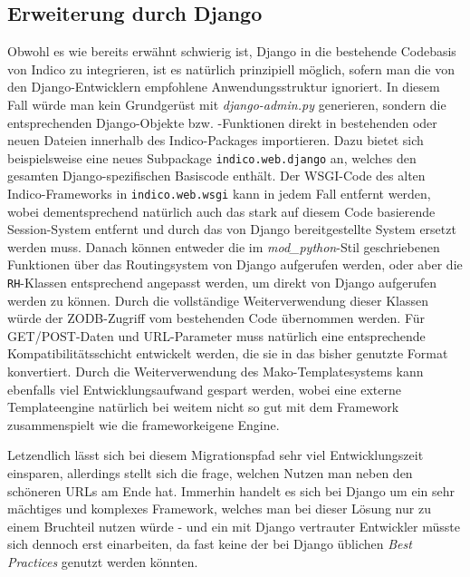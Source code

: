 \subsection{Erweiterung durch Django}
Obwohl es wie bereits erwähnt schwierig ist, Django in die bestehende Codebasis von Indico zu
integrieren, ist es natürlich prinzipiell möglich, sofern man die von den Django-Entwicklern
empfohlene Anwendungsstruktur ignoriert. In diesem Fall würde man kein Grundgerüst mit
\emph{django-admin.py} generieren, sondern die entsprechenden Django-Objekte bzw. -Funktionen direkt
in bestehenden oder neuen Dateien innerhalb des Indico-Packages importieren. Dazu bietet sich
beispielsweise eine neues Subpackage \lstinline{indico.web.django} an, welches den gesamten
Django-spezifischen Basiscode enthält. Der WSGI-Code des alten Indico-Frameworks in
\lstinline{indico.web.wsgi} kann in jedem Fall entfernt werden, wobei dementsprechend natürlich auch
das stark auf diesem Code basierende Session-System entfernt und durch das von Django
bereitgestellte System ersetzt werden muss. Danach können entweder die im \emph{mod\_python}-Stil
geschriebenen Funktionen über das Routingsystem von Django aufgerufen werden, oder aber die
\lstinline{RH}-Klassen entsprechend angepasst werden, um direkt von Django aufgerufen werden zu
können. Durch die vollständige Weiterverwendung dieser Klassen würde der ZODB-Zugriff vom
bestehenden Code übernommen werden. Für GET/POST-Daten und URL-Parameter muss natürlich eine
entsprechende Kompatibilitätsschicht entwickelt werden, die sie in das bisher genutzte Format
konvertiert. Durch die Weiterverwendung des Mako-Templatesystems kann ebenfalls viel
Entwicklungsaufwand gespart werden, wobei eine externe Templateengine natürlich bei weitem nicht so
gut mit dem Framework zusammenspielt wie die frameworkeigene Engine.

Letzendlich lässt sich bei diesem Migrationspfad sehr viel Entwicklungszeit einsparen, allerdings
stellt sich die frage, welchen Nutzen man neben den schöneren URLs am Ende hat. Immerhin handelt es
sich bei Django um ein sehr mächtiges und komplexes Framework, welches man bei dieser Lösung nur zu
einem Bruchteil nutzen würde - und ein mit Django vertrauter Entwickler müsste sich dennoch erst
einarbeiten, da fast keine der bei Django üblichen \emph{Best Practices} genutzt werden könnten.

